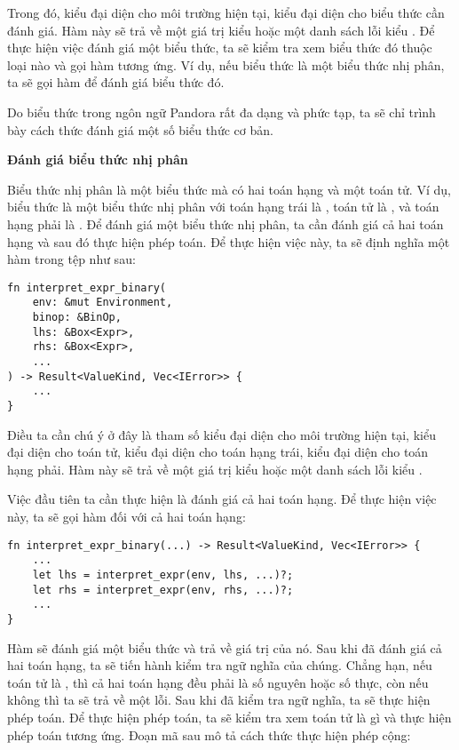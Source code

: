     Trong đó,  kiểu  đại diện cho môi trường hiện tại,  kiểu  đại diện cho biểu thức cần đánh giá. Hàm này sẽ trả về một giá trị kiểu  hoặc một danh sách lỗi kiểu . Để thực hiện việc đánh giá một biểu thức, ta sẽ kiểm tra xem biểu thức đó thuộc loại nào và gọi hàm tương ứng. Ví dụ, nếu biểu thức là một biểu thức nhị phân, ta sẽ gọi hàm  để đánh giá biểu thức đó.

    Do biểu thức trong ngôn ngữ Pandora rất đa dạng và phức tạp, ta sẽ chỉ trình bày cách thức đánh giá một số biểu thức cơ bản. 

\noindent \textbf{Đánh giá biểu thức nhị phân}

    Biểu thức nhị phân là một biểu thức mà có hai toán hạng và một toán tử. Ví dụ, biểu thức  là một biểu thức nhị phân với toán hạng trái là , toán tử là \kw{+}, và toán hạng phải là . Để đánh giá một biểu thức nhị phân, ta cần đánh giá cả hai toán hạng và sau đó thực hiện phép toán. Để thực hiện việc này, ta sẽ định nghĩa một hàm  trong tệp  như sau:

\begin{lstlisting}[]
fn interpret_expr_binary(
    env: &mut Environment,
    binop: &BinOp,
    lhs: &Box<Expr>,
    rhs: &Box<Expr>,
    ...
) -> Result<ValueKind, Vec<IError>> {
    ...
}
\end{lstlisting}

    Điều ta cần chú ý ở đây là tham số  kiểu  đại diện cho môi trường hiện tại,  kiểu  đại diện cho toán tử,  kiểu  đại diện cho toán hạng trái,  kiểu  đại diện cho toán hạng phải. Hàm này sẽ trả về một giá trị kiểu  hoặc một danh sách lỗi kiểu .

    Việc đầu tiên ta cần thực hiện là đánh giá cả hai toán hạng. Để thực hiện việc này, ta sẽ gọi hàm  đối với cả hai toán hạng:

\begin{lstlisting}[]
fn interpret_expr_binary(...) -> Result<ValueKind, Vec<IError>> {
    ...
    let lhs = interpret_expr(env, lhs, ...)?;
    let rhs = interpret_expr(env, rhs, ...)?;
    ...
}
\end{lstlisting}

    Hàm  sẽ đánh giá một biểu thức và trả về giá trị của nó. Sau khi đã đánh giá cả hai toán hạng, ta sẽ tiến hành kiểm tra ngữ nghĩa của chúng. Chẳng hạn, nếu toán tử là \kw{+}, thì cả hai toán hạng đều phải là số nguyên hoặc số thực, còn nếu không thì ta sẽ trả về một lỗi. Sau khi đã kiểm tra ngữ nghĩa, ta sẽ thực hiện phép toán. Để thực hiện phép toán, ta sẽ kiểm tra xem toán tử là gì và thực hiện phép toán tương ứng. Đoạn mã sau mô tả cách thức thực hiện phép cộng:

